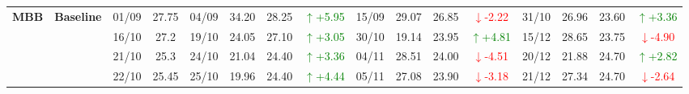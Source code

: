 \documentclass{ieeeaccess}
\begin{document}
{\begin{longtable}{llcc|cccc|cccc|cccc}
\multirow{4}{*}{\textbf{MBB}}
& \textbf{Baseline}
& 01/09 & 27.75 & 04/09 & 34.20 & 28.25 & \textcolor{green}{\(\uparrow\)+5.95} & 15/09 & 29.07 & 26.85 & \textcolor{red}{\(\downarrow\)-2.22} & 31/10 & 26.96 & 23.60 & \textcolor{green}{\(\uparrow\)+3.36} \\
& & 16/10 & 27.2 & 19/10 & 24.05 & 27.10 & \textcolor{green}{\(\uparrow\)+3.05} & 30/10 & 19.14 & 23.95 & \textcolor{green}{\(\uparrow\)+4.81} & 15/12 & 28.65 & 23.75 & \textcolor{red}{\(\downarrow\)-4.90} \\
& & 21/10 & 25.3 & 24/10 & 21.04 & 24.40 & \textcolor{green}{\(\uparrow\)+3.36} & 04/11 & 28.51 & 24.00 & \textcolor{red}{\(\downarrow\)-4.51} & 20/12 & 21.88 & 24.70 & \textcolor{green}{\(\uparrow\)+2.82} \\
& & 22/10 & 25.45 & 25/10 & 19.96 & 24.40 & \textcolor{green}{\(\uparrow\)+4.44} & 05/11 & 27.08 & 23.90 & \textcolor{red}{\(\downarrow\)-3.18} & 21/12 & 27.34 & 24.70 & \textcolor{red}{\(\downarrow\)-2.64} \\
\midrule

\end{longtable}
}

\clearpage
\onecolumn
\end{document}
